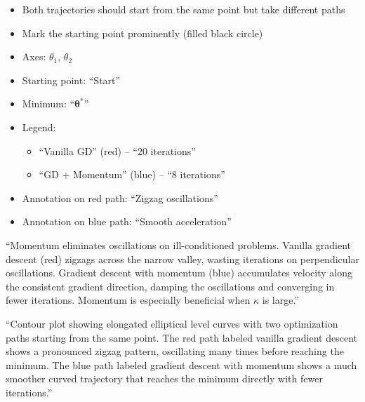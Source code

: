 \documentclass[12pt]{article}
\begin{document}
\begin{description}[style=nextline, leftmargin=0pt]
\begin{itemize}
        \item Both trajectories should start from the same point but take different paths
        \item Mark the starting point prominently (filled black circle)
    \end{itemize}

    \item[Required Labels]
    \begin{itemize}
        \item Axes: $\theta_1$, $\theta_2$
        \item Starting point: ``Start''
        \item Minimum: ``$\boldsymbol{\theta}^*$''
        \item Legend:
        \begin{itemize}
            \item ``Vanilla GD'' (red) -- ``20 iterations''
            \item ``GD + Momentum'' (blue) -- ``8 iterations''
        \end{itemize}
        \item Annotation on red path: ``Zigzag oscillations''
        \item Annotation on blue path: ``Smooth acceleration''
    \end{itemize}

    \item[Caption Text]
    ``Momentum eliminates oscillations on ill-conditioned problems. Vanilla gradient descent (red) zigzags across the narrow valley, wasting iterations on perpendicular oscillations. Gradient descent with momentum (blue) accumulates velocity along the consistent gradient direction, damping the oscillations and converging in fewer iterations. Momentum is especially beneficial when $\kappa$ is large.''

    \item[Alt-Text for Accessibility]
    ``Contour plot showing elongated elliptical level curves with two optimization paths starting from the same point. The red path labeled vanilla gradient descent shows a pronounced zigzag pattern, oscillating many times before reaching the minimum. The blue path labeled gradient descent with momentum shows a much smoother curved trajectory that reaches the minimum directly with fewer iterations.''
\end{description}

\newpage

\end{document}
